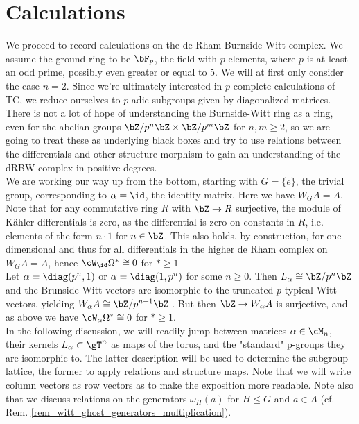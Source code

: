\section{Calculations}
We proceed to record calculations on the de Rham-Burnside-Witt complex. We assume the ground ring to be $\bF_p$, the field with $p$ elements, where $p$ is at least an odd prime, possibly even greater or equal to 5. We will at first only consider the case $n=2$. Since we're ultimately interested in $p$-complete calculations of TC, we reduce ourselves to $p$-adic subgroups given by diagonalized matrices.\\
There is not a lot of hope of understanding the Burnside-Witt ring as a ring, even for the abelian groups $\bZ/p^n\bZ \times \bZ/p^m\bZ$ for $n,m \geq 2$, so we are going to treat these as underlying black boxes and try to use relations between the differentials and other structure morphism to gain an understanding of the dRBW-complex in positive degrees.\\
We are working our way up from the bottom, starting with $G=\{e\}$, the trivial group, corresponding to $\alpha = \id$, the identity matrix. Here we have $W_G A = A$. Note that for any commutative ring $R$ with $\bZ \to R$ surjective, the module of K\"ahler differentials is zero, as the differential is zero on constants in $R$, i.e. elements of the form $n \cdot 1$ for $n \in \bZ$. This also holds, by construction, for one-dimensional and thus for all differentials in the higher de Rham complex on $W_G A = A$, hence $\cW_{\id}\Omega^* \cong 0$ for $* \geq 1$\\
Let $\alpha = \diag(p^n, 1)$ or $\alpha = \diag(1,p^n)$ for some $n \geq 0$. Then $L_\alpha \cong \bZ/p^n\bZ$ and the Brunside-Witt vectors are isomorphic to the truncated $p$-typical Witt vectors, yielding $W_\alpha A \cong \bZ/p^{n+1}\bZ$ . But then $\bZ \to W_\alpha A$ is surjective, and as above we have $\cW_{\alpha}\Omega^* \cong 0$ for $* \geq 1$.\\
In the following discussion, we will readily jump between matrices $\alpha \in \cM_n$, their kernels $L_\alpha \subset \gT^n$ as maps of the torus, and the "standard" p-groups they are isomorphic to. The latter description will be used to determine the subgroup lattice, the former to apply relations and structure maps. Note that we will write column vectors as row vectors as to make the exposition more readable. Note also that we discuss relations on the generators $\omega_H (a)$ for $H \leq G$ and $a \in A$ (cf. Rem. \ref{rem_witt_ghost_generators_multiplication}).

